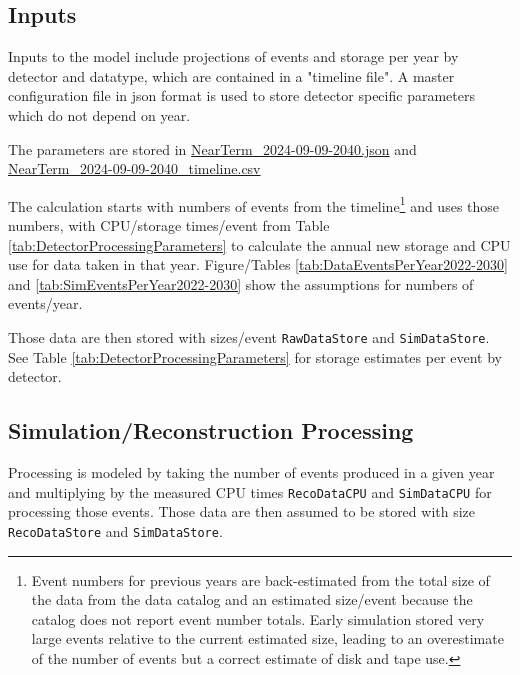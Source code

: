 \documentclass[12pt]{article}
\begin{document}
  \subsection{Inputs}
  
 Inputs to the model include projections of events and storage per year by detector and datatype, which are contained in a "timeline file".  A master configuration file in json format is used to store detector specific parameters which do not depend on year. 
 
 The parameters are stored in \href{https://github.com/DUNE/CCB-data/blob/CCB-Jun24/model-2024/NearTerm_2024-09-09-2040.json}{NearTerm\_2024-09-09-2040.json} and  \href{https://github.com/DUNE/CCB-data/blob/CCB-Jun24/model-2024/NearTerm_2024-09-09-2040_timeline.csv}{NearTerm\_2024-09-09-2040\_timeline.csv}
 
The calculation starts with numbers of events from the timeline\footnote{Event numbers for previous years are back-estimated from the total size of the data from the data catalog and an estimated size/event because the catalog does not report event number totals.  Early simulation stored very large events relative to the current estimated size, leading to an overestimate of the number of events but a correct estimate of disk and tape use.}  and uses those numbers, with CPU/storage times/event from Table \ref{tab:DetectorProcessingParameters} to calculate the annual new storage and CPU use for data taken in that year.  Figure/Tables \ref{tab:DataEventsPerYear2022-2030} and \ref{tab:SimEventsPerYear2022-2030} show the assumptions for numbers of events/year. 

{
}

{
}

Those data are then stored with sizes/event {\tt RawDataStore} and {\tt SimDataStore}.  See Table \ref{tab:DetectorProcessingParameters} for storage estimates per event by detector. 

\subsection{Simulation/Reconstruction Processing}

Processing is modeled by taking the number of events produced in a given year and multiplying by the measured CPU times {\tt RecoDataCPU} and {\tt SimDataCPU} for processing those events.  Those data are then assumed to be stored with size {\tt  RecoDataStore} and {\tt SimDataStore}.
\end{document}
